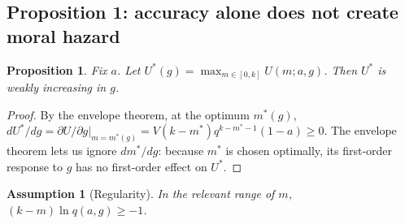 \documentclass[11pt]{article}
\newtheorem{proposition}{Proposition}
\newtheorem{assumption}{Assumption}
\begin{document}
\subsection{Proposition 1: accuracy alone does not create moral hazard}

\begin{proposition}\label{prop:accuracy}
Fix $a$. Let $U^*(g) = \max_{m \in [0,k]} U(m;a,g)$. Then $U^*$ is weakly
increasing in $g$.
\end{proposition}

\begin{proof}
By the envelope theorem, at the optimum $m^*(g)$,
$dU^*/dg = \partial U/\partial g\big|_{m=m^*(g)} = V(k-m^*)q^{k-m^*-1}(1-a) \ge 0$.
The envelope theorem lets us ignore $dm^*/dg$: because $m^*$ is chosen optimally,
its first-order response to $g$ has no first-order effect on $U^*$.
\end{proof}

\begin{assumption}[Regularity]\label{ass:reg}
In the relevant range of $m$, $(k-m)\ln q(a,g) \ge -1$.
\end{assumption}
\end{document}
